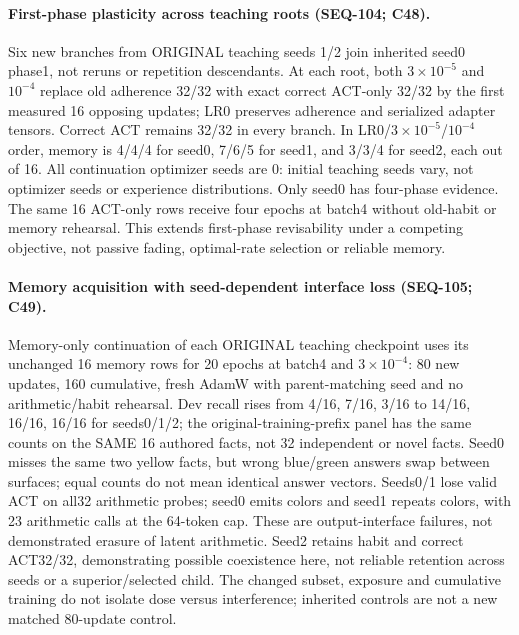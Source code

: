 \documentclass{article}
\begin{document}
\paragraph{First-phase plasticity across teaching roots (SEQ-104; C48).} Six new branches from ORIGINAL teaching seeds 1/2 join inherited seed0 phase1, not reruns or repetition descendants. At each root, both $3\!\times\!10^{-5}$ and $10^{-4}$ replace old adherence 32/32 with exact correct ACT-only 32/32 by the first measured 16 opposing updates; LR0 preserves adherence and serialized adapter tensors. Correct ACT remains 32/32 in every branch. In LR0/$3\!\times\!10^{-5}$/$10^{-4}$ order, memory is 4/4/4 for seed0, 7/6/5 for seed1, and 3/3/4 for seed2, each out of 16. All continuation optimizer seeds are 0: initial teaching seeds vary, not optimizer seeds or experience distributions. Only seed0 has four-phase evidence. The same 16 ACT-only rows receive four epochs at batch4 without old-habit or memory rehearsal. This extends first-phase revisability under a competing objective, not passive fading, optimal-rate selection or reliable memory.

\paragraph{Memory acquisition with seed-dependent interface loss (SEQ-105; C49).} Memory-only continuation of each ORIGINAL teaching checkpoint uses its unchanged 16 memory rows for 20 epochs at batch4 and $3\!\times\!10^{-4}$: 80 new updates, 160 cumulative, fresh AdamW with parent-matching seed and no arithmetic/habit rehearsal. Dev recall rises from 4/16, 7/16, 3/16 to 14/16, 16/16, 16/16 for seeds0/1/2; the original-training-prefix panel has the same counts on the SAME 16 authored facts, not 32 independent or novel facts. Seed0 misses the same two yellow facts, but wrong blue/green answers swap between surfaces; equal counts do not mean identical answer vectors. Seeds0/1 lose valid ACT on all32 arithmetic probes; seed0 emits colors and seed1 repeats colors, with 23 arithmetic calls at the 64-token cap. These are output-interface failures, not demonstrated erasure of latent arithmetic. Seed2 retains habit and correct ACT32/32, demonstrating possible coexistence here, not reliable retention across seeds or a superior/selected child. The changed subset, exposure and cumulative training do not isolate dose versus interference; inherited controls are not a new matched 80-update control.
\end{document}
